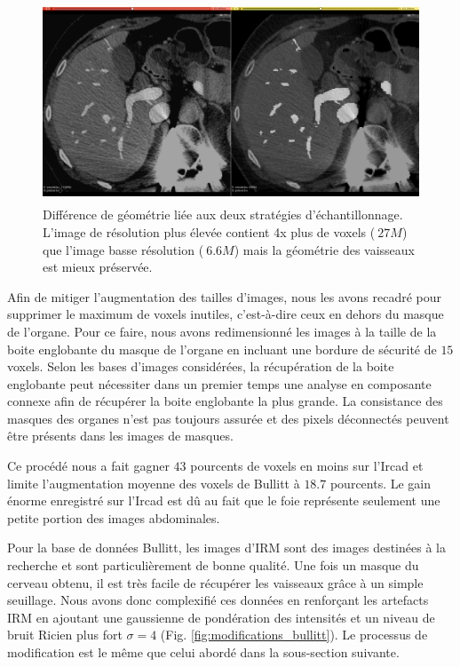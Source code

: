\begin{figure}[h]
  \centering
  \includegraphics[height=6cm]{Images/resolution_comparison.png}
  \caption{Différence de géométrie liée aux deux stratégies d'échantillonnage. L'image de résolution plus élevée contient 4x plus de voxels ($~27M$) que l'image basse résolution ($~6.6M$) mais la géométrie des vaisseaux est mieux préservée.}
  \label{fig:resolution_comparison}
\end{figure}

Afin de mitiger l'augmentation des tailles d'images, nous les avons recadré pour supprimer le maximum de voxels inutiles, c'est-à-dire ceux en dehors du masque de l'organe. Pour ce faire, nous avons redimensionné les images à la taille de la boite englobante du masque de l'organe en incluant une bordure de sécurité de $15$ voxels. Selon les bases d'images considérées, la récupération de la boite englobante peut nécessiter dans un premier temps une analyse en composante connexe afin de récupérer la boite englobante la plus grande. La consistance des masques des organes n'est pas toujours assurée et des pixels déconnectés peuvent être présents dans les images de masques.

Ce procédé nous a fait gagner $43$ pourcents de voxels en moins sur l'Ircad et limite l'augmentation moyenne des voxels de Bullitt à $18.7$ pourcents. Le gain énorme enregistré sur l'Ircad est dû au fait que le foie représente seulement une petite portion des images abdominales.

Pour la base de données Bullitt, les images d'IRM sont des images destinées à la recherche et sont particulièrement de bonne qualité. Une fois un masque du cerveau obtenu, il est très facile de récupérer les vaisseaux grâce à un simple seuillage. Nous avons donc complexifié ces données en renforçant les artefacts IRM en ajoutant une gaussienne de pondération des intensités et un niveau de bruit Ricien plus fort $\sigma=4$ (Fig. \ref{fig:modifications_bullitt}). Le processus de modification est le même que celui abordé dans la sous-section suivante.

